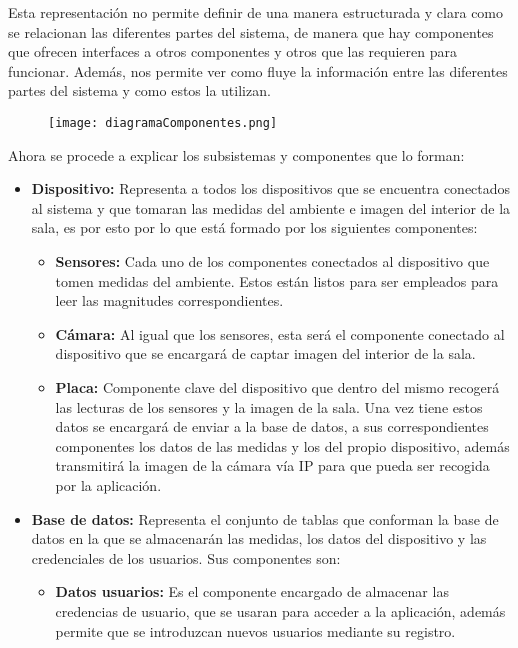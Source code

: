 Esta representación no permite definir de una manera estructurada y clara como se relacionan las diferentes partes del sistema, de manera que hay componentes que ofrecen interfaces a otros componentes y otros que las requieren para funcionar. Además, nos permite ver como fluye la información entre las diferentes partes del sistema y como estos la utilizan.
\begin{figure}[H]
	{\texttt{[image: diagramaComponentes.png]}}
\end{figure}
Ahora se procede a explicar los subsistemas y componentes que lo forman:
\begin{itemize}
	\item \textbf{Dispositivo:} Representa a todos los dispositivos que se encuentra conectados al sistema y que tomaran las medidas del ambiente e imagen del interior de la sala, es por esto por lo que está formado por los siguientes componentes:
	      \begin{itemize}
		      \item \textbf{Sensores:} Cada uno de los componentes conectados al dispositivo que tomen medidas del ambiente. Estos están listos para ser empleados para leer las magnitudes correspondientes.
		      \item \textbf{Cámara:} Al igual que los sensores, esta será el componente conectado al dispositivo que se encargará de captar imagen del interior de la sala.
		      \item \textbf{Placa:} Componente clave del dispositivo que dentro del mismo recogerá las lecturas de los sensores y la imagen de la sala. Una vez tiene estos datos se encargará de enviar a la base de datos, a sus correspondientes componentes los datos de las medidas y los del propio dispositivo, además transmitirá la imagen de la cámara vía IP para que pueda ser recogida por la aplicación.
	      \end{itemize}
	\item \textbf{Base de datos:} Representa el conjunto de tablas que conforman la base de datos en la que se almacenarán las medidas, los datos del dispositivo y las credenciales de los usuarios. Sus componentes son:
	      \begin{itemize}
		      \item \textbf{Datos usuarios:} Es el componente encargado de almacenar las credencias de usuario, que se usaran para acceder a la aplicación, además permite que se introduzcan nuevos usuarios mediante su registro.

\end{itemize}
\end{itemize}
